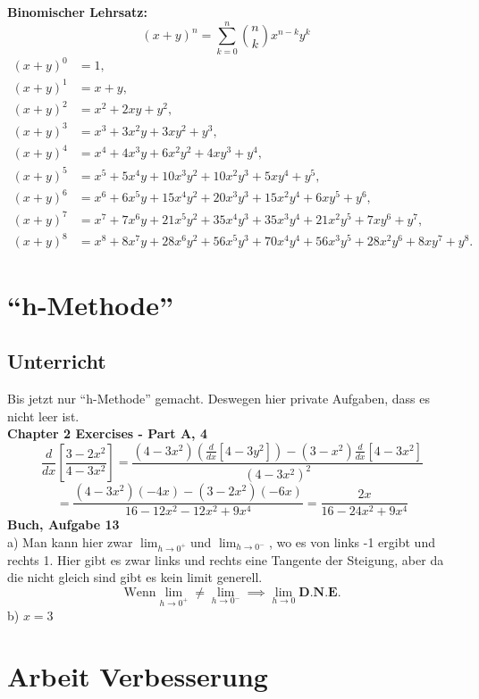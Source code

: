\documentclass{book}
\begin{document}
\textbf{Binomischer Lehrsatz:}
\[(x+y)^n = \sum_{k=0}^{n}\binom{n}{k} x^{n-k}y^{k} \quad\]
\begin{align*}
(x+y)^0 & = 1, \\[8pt]
(x+y)^1 & = x + y, \\[8pt]
(x+y)^2 & = x^2 + 2xy + y^2, \\[8pt]
(x+y)^3 & = x^3 + 3x^2y + 3xy^2 + y^3, \\[8pt]
(x+y)^4 & = x^4 + 4x^3y + 6x^2y^2 + 4xy^3 + y^4, \\[8pt]
(x+y)^5 & = x^5 + 5x^4y + 10x^3y^2 + 10x^2y^3 + 5xy^4 + y^5, \\[8pt]
(x+y)^6 & = x^6 + 6x^5y + 15x^4y^2 + 20x^3y^3 + 15x^2y^4 + 6xy^5 + y^6, \\[8pt]
(x+y)^7 & = x^7 + 7x^6y + 21x^5y^2 + 35x^4y^3 + 35x^3y^4 + 21x^2y^5 + 7xy^6 + y^7, \\[8pt]
(x+y)^8 & = x^8 + 8x^7y + 28x^6y^2 + 56x^5y^3 + 70x^4y^4 + 56x^3y^5 + 28x^2y^6 + 8xy^7 + y^8.
\end{align*}
\clearpage

\section{``h-Methode''}
\subsection{Unterricht}
Bis jetzt nur ``h-Methode'' gemacht. Deswegen hier private Aufgaben, dass es nicht leer ist.
\\\textbf{Chapter 2 Exercises - Part A, 4}
\[\frac{d}{dx}\left[\frac{3-2x^2}{4-3x^2}\right]= \frac{(4-3x^2)\left( \frac{d}{dx}\left[4-3y^2\right]
 \right)-(3-x^2)\frac{d}{dx}\left[4-3x^2\right]
}{\left( 4-3x^2 \right)^2 }\]\[= \frac{(4-3x^2)(-4x)-(3-2x^2)(-6x)}{16-12x^2-12x^2+9x^4}= \frac{2x}{16-24x^2+9x^4} \]
\textbf{Buch, Aufgabe 13}
\\a) Man kann hier zwar $\lim_{h \to 0^+ } $und $ \lim_{h \to 0^-}$, wo es von links -1 ergibt und rechts 1. Hier gibt es zwar links und rechts eine Tangente der Steigung, aber da die nicht gleich sind gibt es kein limit generell.
\[ \text{Wenn} \lim_{h \to 0^+ } \ne \lim_{h \to 0^-} \implies \lim_{h \to 0} \textbf{D.N.E.}\]
b) $x=3$

\clearpage
\section{Arbeit Verbesserung}
\end{document}
